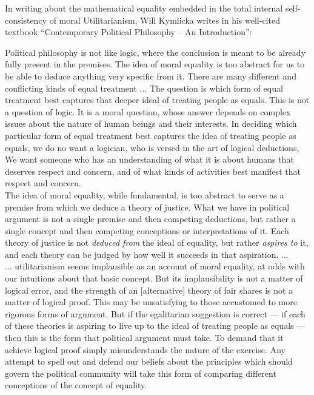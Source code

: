 \documentclass{article}
\begin{document}
In writing about the mathematical equality embedded in the total internal self-consistency of moral Utilitarianism, Will Kymlicka writes in his well-cited textbook ``Contemporary Political Philosophy -- An Introduction'':
\begin{displayquote}
Political philosophy is not like logic, where the conclusion is meant to be already fully present in the premises. The idea of moral equality is too abstract for us to be able to deduce anything very specific from it. There are many different and conflicting kinds of equal treatment ... The question is which form of equal treatment best captures that deeper ideal of treating people as equals. This is not a question of logic. It is a moral question, whose answer depends on complex issues about the nature of human beings and their interests. In deciding which particular form of equal treatment best captures the idea of treating people as equals, we do no want a logician, who is versed in the art of logical deductions, We want someone who has an understanding of what it is about humans that deserves respect and concern, and of what kinds of activities best manifest that respect and concern.\\
The idea of moral equality, while fundamental, is too abstract to serve as a premise from which we deduce a theory of justice. What we have in political argument is not a single premise and then competing deductions, but rather a single concept and then competing conceptions or interpretations of it. Each theory of justice is not \textit{deduced from} the ideal of equality, but rather \textit{aspires to} it, and each theory can be judged by how well it succeeds in that aspiration.
... \\
... utilitarianism seems implausible as an account of moral equality, at odds with our intuitions about that basic concept. But its implausibility is not a matter of logical error, and the strength of an [alternative] theory of fair shares is not a matter of logical proof. This may be unsatisfying to those accustomed to more rigorous forms of argument. But if the egalitarian suggestion is correct --- if each of these theories is aspiring to live up to the ideal of treating people as equals --- then this is the form that political argument must take. To demand that it achieve logical proof simply misunderstands the nature of the exercise. Any attempt to spell out and defend our beliefs about the principles which should govern the political community will take this form of comparing different conceptions of the concept of equality.
\cite{kymlicka2002contemporary}
\end{displayquote}
\end{document}
